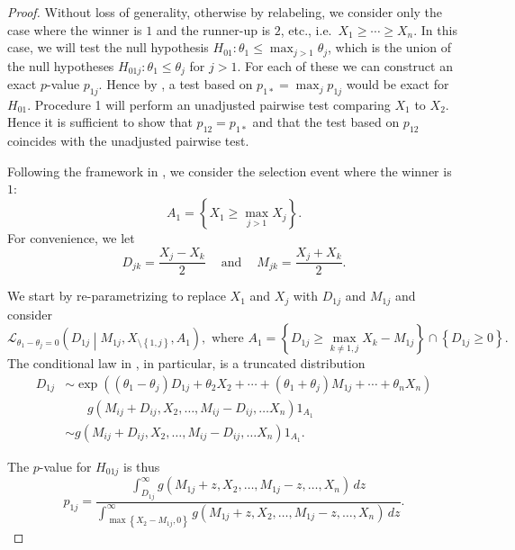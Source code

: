 \documentclass[11pt]{article}
\begin{document}
\begin{proof}
Without loss of generality, otherwise by relabeling, we consider only the case where the winner is $1$ and the runner-up is $2$, etc., i.e.\ $X_1 \ge \cdots \ge X_n$. In this case, we will test the null hypothesis $H_{01}: \theta_1 \le \max_{j > 1} \theta_j$, which is the union of the null hypotheses $H_{01j}: \theta_1 \le \theta_j$ for $j > 1$. For each of these we can construct an exact $p$-value $p_{1j}$. Hence by , a test based on $p_{1*} = \max_j p_{1j}$ would be exact for $H_{01}$. Procedure 1 will perform an unadjusted pairwise test comparing $X_1$ to $X_2$. Hence it is sufficient to show that $p_{12} = p_{1*}$ and that the test based on $p_{12}$ coincides with the unadjusted pairwise test.

Following the framework in \citet{Fithian:2014ws}, we consider the selection event where the winner is $1$: $$A_1 = \left\{X_1 \ge \max_{j > 1} X_j\right\}.$$
For convenience, we let
$$D_{jk} = \frac{X_j - X_k}{2} ~~~~ \text{ and } ~~~~ M_{jk} = \frac{X_j + X_k}{2}.$$

We start by re-parametrizing to replace $X_1$ and $X_j$ with $D_{1j}$ and $M_{1j}$ and consider
\begin{equation}
\mathcal{L}_{\theta_1 - \theta_j = 0} \left(D_{1j} \middle| M_{1j}, X_{\setminus\left\{1, j\right\}}, A_1\right), \text{ where } A_1 = \left\{D_{1j} \ge \max_{k \ne 1, j} X_k - M_{1j}\right\} \cap \left\{D_{1j} \ge 0\right\}.
\label{eqn:condlaw}
\end{equation}
The conditional law in , in particular, is a truncated distribution
\begin{align*}
D_{1j} & \sim \exp\left(\left(\theta_1 - \theta_j\right) D_{1j} + \theta_2 X_2 + \cdots + \left(\theta_1 + \theta_j\right) M_{1j} + \cdots + \theta_n X_n \right) \\
& ~~~~~~~~ g\left(M_{ij} + D_{ij}, X_2, \ldots, M_{ij} - D_{ij}, \ldots X_n\right) 1_{A_1} \\
& \sim g\left(M_{ij} + D_{ij}, X_2, \ldots, M_{ij} - D_{ij}, \ldots X_n\right) 1_{A_1}.
\end{align*}

The $p$-value for $H_{01j}$ is thus
\begin{equation}
p_{1j} = \frac{\int_{D_{1j}}^\infty g\left(M_{1j} + z, X_2, \ldots, M_{1j} - z, \ldots, X_n\right) \,dz}{\int_{\max\left\{X_2 - M_{1j}, 0\right\}}^\infty g\left(M_{1j} + z, X_2, \ldots, M_{1j} - z, \ldots, X_n\right) \,dz}.
\label{eqn:p1j}
\end{equation}


\end{proof}
\end{document}
